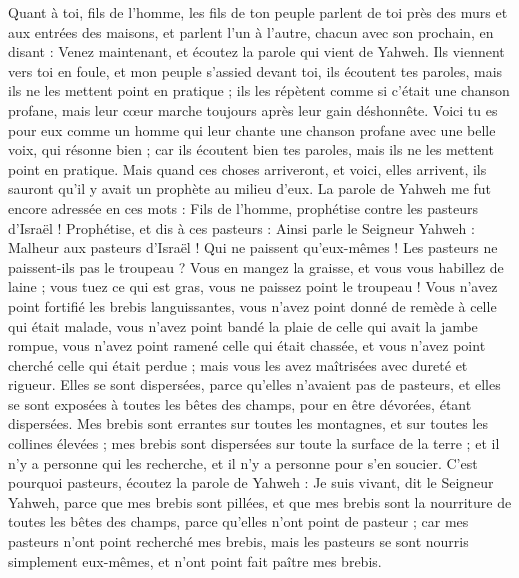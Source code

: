 \begin{multicols}{2}
Quant à toi, fils de l'homme, les fils de ton peuple parlent de toi près des murs et aux entrées des maisons, et parlent l'un à l'autre, chacun avec son prochain, en disant : Venez maintenant, et écoutez la parole qui vient de Yahweh.
Ils viennent vers toi en foule, et mon peuple s'assied devant toi, ils écoutent tes paroles, mais ils ne les mettent point en pratique ; ils les répètent comme si c'était une chanson profane, mais leur cœur marche toujours après leur gain déshonnête.
Voici tu es pour eux comme un homme qui leur chante une chanson profane avec une belle voix, qui résonne bien ; car ils écoutent bien tes paroles, mais ils ne les mettent point en pratique.
Mais quand ces choses arriveront, et voici, elles arrivent, ils sauront qu'il y avait un prophète au milieu d'eux.
\VerseOne{}La parole de Yahweh me fut encore adressée en ces mots :
Fils de l'homme, prophétise contre les pasteurs d'Israël ! Prophétise, et dis à ces pasteurs : Ainsi parle le Seigneur Yahweh : Malheur aux pasteurs d'Israël ! Qui ne paissent qu'eux-mêmes ! Les pasteurs ne paissent-ils pas le troupeau ?
Vous en mangez la graisse, et vous vous habillez de laine ; vous tuez ce qui est gras, vous ne paissez point le troupeau !
Vous n'avez point fortifié les brebis languissantes, vous n'avez point donné de remède à celle qui était malade, vous n'avez point bandé la plaie de celle qui avait la jambe rompue, vous n'avez point ramené celle qui était chassée, et vous n'avez point cherché celle qui était perdue ; mais vous les avez maîtrisées avec dureté et rigueur.
Elles se sont dispersées, parce qu'elles n'avaient pas de pasteurs, et elles se sont exposées à toutes les bêtes des champs, pour en être dévorées, étant dispersées.
Mes brebis sont errantes sur toutes les montagnes, et sur toutes les collines élevées ; mes brebis sont dispersées sur toute la surface de la terre ; et il n'y a personne qui les recherche, et il n'y a personne pour s'en soucier.
C'est pourquoi pasteurs, écoutez la parole de Yahweh :
Je suis vivant, dit le Seigneur Yahweh, parce que mes brebis sont pillées, et que mes brebis sont la nourriture de toutes les bêtes des champs, parce qu'elles n'ont point de pasteur ; car mes pasteurs n'ont point recherché mes brebis, mais les pasteurs se sont nourris simplement eux-mêmes, et n'ont point fait paître mes brebis.

\end{multicols}

